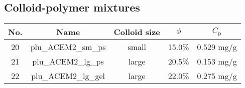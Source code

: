 \subsection{Colloid-polymer mixtures}\label{colloid-polymer-mixtures}
\begin{center}
\begin{tabular}{c|c|c|c|c}
No. & Name & Colloid size & $\phi$ & $C_\mathrm{p}$ \\
\hline
20 & plu\_ACEM2\_sm\_ps & small & 15.0\% & 0.529 mg/g\\
21 & plu\_ACEM2\_lg\_ps & large & 20.5\% & 0.153 mg/g\\
22 & plu\_ACEM2\_lg\_gel & large & 22.0\% & 0.275 mg/g\\
\end{tabular}
\end{center}

